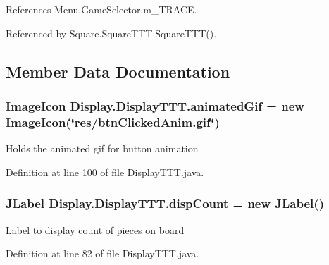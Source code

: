 References Menu.\+Game\+Selector.\+m\+\_\+\+T\+R\+A\+C\+E.



Referenced by Square.\+Square\+T\+T\+T.\+Square\+T\+T\+T().



\subsection{Member Data Documentation}
\hypertarget{class_display_1_1_display_t_t_t_a6ff178cba82943d451e39c7c6b577f83}{}
\subsubsection[{animated\+Gif}]{\setlength{\rightskip}{0pt plus 5cm}Image\+Icon Display.\+Display\+T\+T\+T.\+animated\+Gif = new Image\+Icon(\char`\"{}res/btn\+Clicked\+Anim.\+gif\char`\"{})\hspace{0.3cm}{\ttfamily [private]}}\label{class_display_1_1_display_t_t_t_a6ff178cba82943d451e39c7c6b577f83}
Holds the animated gif for button animation 

Definition at line 100 of file Display\+T\+T\+T.\+java.

\hypertarget{class_display_1_1_display_t_t_t_afbec846dfebaa4c2640cd270ec21c8b9}{}
\subsubsection[{disp\+Count}]{\setlength{\rightskip}{0pt plus 5cm}J\+Label Display.\+Display\+T\+T\+T.\+disp\+Count = new J\+Label()\hspace{0.3cm}{\ttfamily [private]}}\label{class_display_1_1_display_t_t_t_afbec846dfebaa4c2640cd270ec21c8b9}
Label to display count of pieces on board 

Definition at line 82 of file Display\+T\+T\+T.\+java.

\hypertarget{class_display_1_1_display_t_t_t_a2f2eeba39f4aa0dcc00ef6b72e2b6c66}{}
